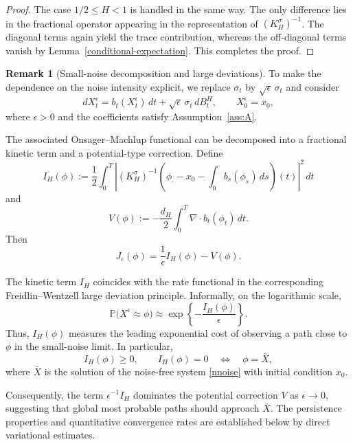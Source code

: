 \documentclass[preprint,12pt]{elsarticle}
\theoremstyle{definition}
\newtheorem{remark}{Remark}[section]
\theoremstyle{plain}
\begin{document}
\begin{proof}
The case \(1/2\leq H<1\) is handled in the same way. The only difference lies in the
fractional operator appearing in the representation of \((K_H^\sigma)^{-1}\).
The diagonal terms again yield the trace contribution, whereas the
off-diagonal terms vanish by Lemma~\ref{conditional-expectation}. This
completes the proof.
\end{proof}





\begin{remark}[Small-noise decomposition and large deviations]
\label{rem:OM-LDP-relation}
To make the dependence on the noise intensity explicit, we replace
$\sigma_t$ by $\sqrt{\epsilon}\,\sigma_t$ and consider
\begin{equation}
\label{sde}
    dX_t^\epsilon
    =
    b_t(X_t^\epsilon)\,dt
    +
    \sqrt{\epsilon}\,\sigma_t\,dB_t^H,
    \qquad
    X_0^\epsilon=x_0,
\end{equation}
where $\epsilon>0$ and the coefficients satisfy
Assumption~\ref{ass:A}.

The associated Onsager--Machlup functional can be decomposed into a
fractional kinetic term and a potential-type correction. Define
\begin{equation}
\label{eq:fractional-kinetic-term}
    I_H(\phi)
    :=
    \frac12
    \int_0^T
    \left|
        (K_H^\sigma)^{-1}
        \left(
            \phi_\cdot-x_0
            -
            \int_0^\cdot b_s(\phi_s)\,ds
        \right)(t)
    \right|^2\,dt
\end{equation}
and
\begin{equation}
\label{eq:potential-term}
    V(\phi)
    :=
    -\frac{d_H}{2}
    \int_0^T
    \nabla\!\cdot b_t(\phi_t)\,dt.
\end{equation}
Then
\begin{equation}
\label{eq:OM-kinetic-potential-decomposition}
    J_\epsilon(\phi)
    =
    \frac{1}{\epsilon}I_H(\phi)-V(\phi).
\end{equation}

The kinetic term $I_H$ coincides with the rate functional in the
corresponding Freidlin--Wentzell large deviation principle. Informally,
on the logarithmic scale,
\begin{equation*}
    \mathbb P\bigl(X^\epsilon\approx\phi\bigr)
    \approx
    \exp\left\{
        -\frac{I_H(\phi)}{\epsilon}
    \right\}.
\end{equation*}
Thus, $I_H(\phi)$ measures the leading exponential cost of observing a
path close to $\phi$ in the small-noise limit. In particular,
\begin{equation*}
    I_H(\phi)\geq0,
    \qquad
    I_H(\phi)=0
    \quad\Longleftrightarrow\quad
    \phi=\bar X,
\end{equation*}
where $\bar X$ is the solution of the noise-free system
\eqref{nnoise} with initial condition $x_0$.

Consequently, the term $\epsilon^{-1}I_H$ dominates the potential
correction $V$ as $\epsilon\to0$, suggesting that global most probable
paths should approach $\bar X$. The persistence properties and
quantitative convergence rates are established below by direct
variational estimates.
\end{remark}
\end{document}
